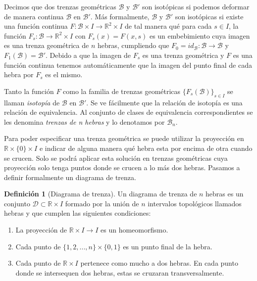 \documentclass[12pt]{article}
\theoremstyle{definition}
\newtheorem{defi}{Definición}[section]
\begin{document}
Decimos que dos trenzas geométricas $\mathcal{B}$ y $\mathcal{B}'$ son isotópicas si podemos deformar de manera continua $\mathcal{B}$ en $\mathcal{B}'$. Más formalmente, $\mathcal{B}$ y $\mathcal{B}'$ son isotópicas si existe una función continua $F : \mathcal{B} \times I \rightarrow \mathbb{R}^2\times I$ de tal manera qué para cada $s\in I$, la función $F_s : \mathcal{B}\rightarrow \mathbb{R}^2\times I$ con $F_s(x)= F(x,s)$ es un embebimiento cuya imagen es una trenza geométrica de $n$ hebras, cumpliendo que $F_0 = id_{\mathcal{B}}: \mathcal{B}\rightarrow \mathcal{B}$ y $F_1(\mathcal{B}) = \mathcal{B}'$. Debido a que la imagen de $F_s$ es una trenza geométrica y $F$ es una función continua tenemos automáticamente que la imagen del punto final de cada hebra por $F_s$ es el mismo.

Tanto la función $F$ como la familia de trenzas geométricas $\{F_s(\mathcal{B})\}_{s\in I}$ se llaman \textit{isotopía} de $\mathcal{B}$ en $\mathcal{B}'$. Se ve fácilmente que la relación de isotopía es una relación de equivalencia. Al conjunto de clases de equivalencia correspondientes se les denomina \textit{trenzas de n hebras} y lo denotamos por $\mathcal{B}_n$.

Para poder especificar una trenza geométrica se puede utilizar la proyección en $\mathbb{R}\times\{0\}\times I$ e indicar de alguna manera qué hebra esta por encima de otra cuando se crucen. Solo se podrá aplicar esta solución en trenzas geométricas cuya proyección solo tenga puntos donde se crucen a lo más dos hebras. Pasamos a definir formalmente un diagrama de trenza.


\begin{defi}[Diagrama de trenza]\label{diagrama_trenza}
Un diagrama de trenza de $n$ hebras es un conjunto $\mathcal{D}\subset\mathbb{R}\times I$ formado por la unión de $n$ intervalos topológicos llamados hebras y que cumplen las siguientes condiciones: 
\begin{enumerate}
\item La proyección de $\mathbb{R}\times I\rightarrow I$ es un homeomorfismo.
\item Cada punto de $\{1,2,...,n\}\times\{0,1\}$ es un punto final de la hebra.
\item Cada punto de $\mathbb{R}\times I$ pertenece como mucho a dos hebras. En cada punto donde se intersequen dos hebras, estas se cruzaran transversalmente.


\end{enumerate}
\end{defi}
\end{document}
